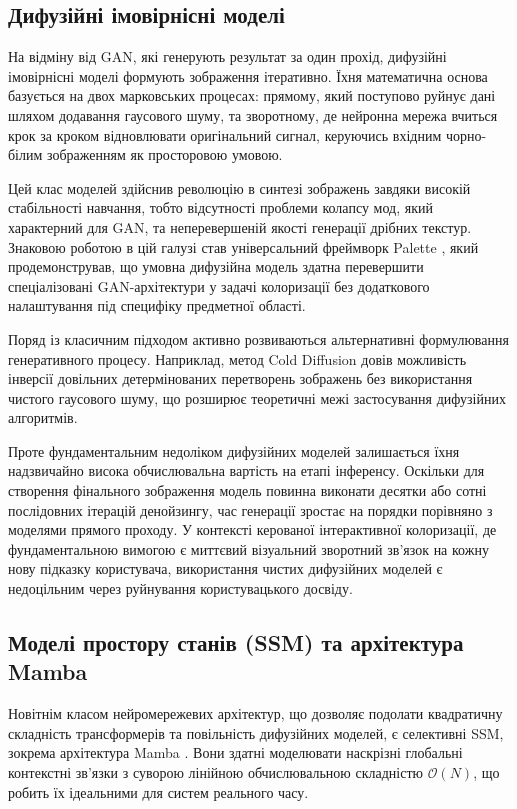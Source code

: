         \subsection{Дифузійні імовірнісні моделі}
            На відміну від GAN, які генерують результат за один прохід, дифузійні імовірнісні моделі формують зображення ітеративно.
            Їхня математична основа базується на двох марковських процесах:
            прямому, який поступово руйнує дані шляхом додавання гаусового шуму,
            та зворотному, де нейронна мережа вчиться крок за кроком відновлювати оригінальний сигнал,
            керуючись вхідним чорно-білим зображенням як просторовою умовою.

            Цей клас моделей здійснив революцію в синтезі зображень завдяки високій стабільності навчання,
            тобто відсутності проблеми колапсу мод, який характерний для GAN, та неперевершеній якості генерації дрібних текстур.
            Знаковою роботою в цій галузі став універсальний фреймворк Palette \cite{2022-palette-image-to-image-diffusion-models},
            який продемонстрував, що умовна дифузійна модель здатна перевершити спеціалізовані GAN-архітектури у задачі колоризації без додаткового налаштування під специфіку предметної області. 

            Поряд із класичним підходом активно розвиваються альтернативні формулювання генеративного процесу.
            Наприклад, метод Cold Diffusion \cite{2023-cold-diffusion} довів можливість інверсії довільних детермінованих перетворень зображень без використання чистого гаусового шуму,
            що розширює теоретичні межі застосування дифузійних алгоритмів.

            Проте фундаментальним недоліком дифузійних моделей залишається їхня надзвичайно висока обчислювальна вартість на етапі інференсу.
            Оскільки для створення фінального зображення модель повинна виконати десятки або сотні послідовних ітерацій денойзингу, час генерації зростає на порядки порівняно з моделями прямого проходу.
            У контексті керованої інтерактивної колоризації, де фундаментальною вимогою є миттєвий візуальний зворотний зв'язок на кожну нову підказку користувача, використання чистих дифузійних моделей є недоцільним через руйнування користувацького досвіду.
        
        \subsection{Моделі простору станів (SSM) та архітектура Mamba}
            Новітнім класом нейромережевих архітектур, що дозволяє подолати квадратичну складність трансформерів та повільність дифузійних моделей,
            є селективні SSM, зокрема архітектура Mamba \cite{2023-mamba}.
            Вони здатні моделювати наскрізні глобальні контекстні зв'язки з суворою лінійною обчислювальною складністю $\mathcal{O}(N)$,
            що робить їх ідеальними для систем реального часу.

